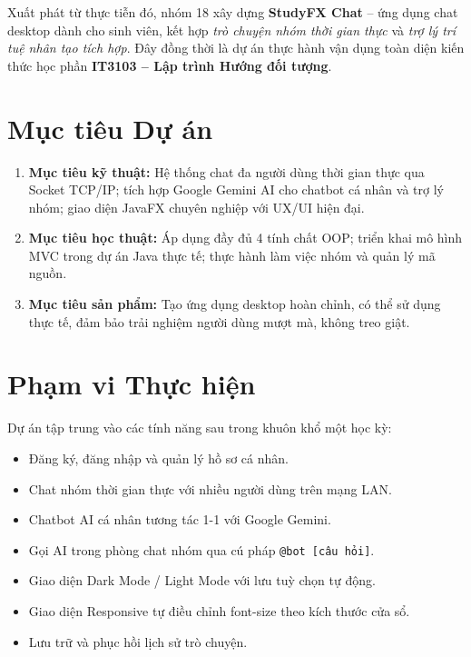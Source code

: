 \documentclass[12pt, a4paper, oneside]{report}
\newcommand{\code}[1]{\texttt{\color{hustblue!80!black}#1}}
\begin{document}
Xuất phát từ thực tiễn đó, nhóm 18 xây dựng \textbf{StudyFX Chat} --
ứng dụng chat desktop dành cho sinh viên, kết hợp \textit{trò chuyện
nhóm thời gian thực} và \textit{trợ lý trí tuệ nhân tạo tích hợp}. Đây
đồng thời là dự án thực hành vận dụng toàn diện kiến thức học phần
\textbf{IT3103 -- Lập trình Hướng đối tượng}.

\section{Mục tiêu Dự án}

\begin{tcolorbox}[infostyle, title={Ba nhóm mục tiêu chính}]
\begin{enumerate}[leftmargin=1.5em, itemsep=6pt]
  \item \textbf{Mục tiêu kỹ thuật:}
    Hệ thống chat đa người dùng thời gian thực qua Socket TCP/IP;
    tích hợp Google Gemini AI cho chatbot cá nhân và trợ lý nhóm;
    giao diện JavaFX chuyên nghiệp với UX/UI hiện đại.

  \item \textbf{Mục tiêu học thuật:}
    Áp dụng đầy đủ 4 tính chất OOP; triển khai mô hình MVC trong
    dự án Java thực tế; thực hành làm việc nhóm và quản lý mã nguồn.

  \item \textbf{Mục tiêu sản phẩm:}
    Tạo ứng dụng desktop hoàn chỉnh, có thể sử dụng thực tế, đảm bảo
    trải nghiệm người dùng mượt mà, không treo giật.
\end{enumerate}
\end{tcolorbox}

\section{Phạm vi Thực hiện}

Dự án tập trung vào các tính năng sau trong khuôn khổ một học kỳ:

\begin{itemize}[leftmargin=2em, itemsep=3pt]
  \item[\textcolor{hustblue}{$\bullet$}]
    Đăng ký, đăng nhập và quản lý hồ sơ cá nhân.
  \item[\textcolor{hustblue}{$\bullet$}]
    Chat nhóm thời gian thực với nhiều người dùng trên mạng LAN.
  \item[\textcolor{hustblue}{$\bullet$}]
    Chatbot AI cá nhân tương tác 1-1 với Google Gemini.
  \item[\textcolor{hustblue}{$\bullet$}]
    Gọi AI trong phòng chat nhóm qua cú pháp \code{@bot [câu hỏi]}.
  \item[\textcolor{hustblue}{$\bullet$}]
    Giao diện Dark Mode / Light Mode với lưu tuỳ chọn tự động.
  \item[\textcolor{hustblue}{$\bullet$}]
    Giao diện Responsive tự điều chỉnh font-size theo kích thước cửa sổ.
  \item[\textcolor{hustblue}{$\bullet$}]
    Lưu trữ và phục hồi lịch sử trò chuyện.
\end{itemize}
\end{document}

